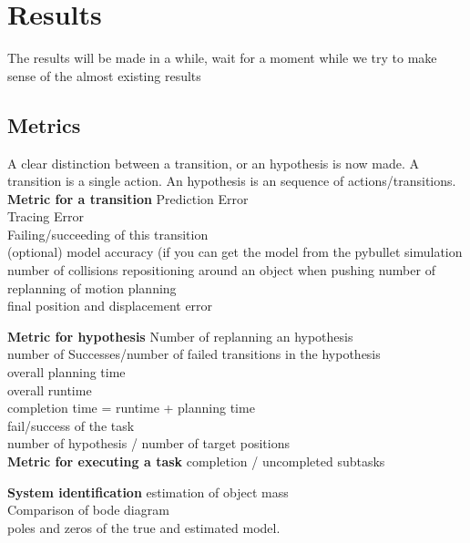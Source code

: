 \chapter{Results}


The results will be made in a while, wait for a moment while we try to make sense of the almost existing results



\section{Metrics}

A clear distinction between a transition, or an hypothesis is now made. A transition is a single action. An hypothesis is an sequence of actions/transitions.\\

\textbf{Metric for a transition}
\newline
Prediction Error\\
Tracing Error\\
Failing/succeeding of this  transition\\
(optional) model accuracy (if you can get the model from the pybullet simulation
number of collisions
repositioning around an object when pushing
number of replanning of motion planning\\
final position and displacement error\\


\textbf{Metric for hypothesis}
\newline
Number of replanning an hypothesis\\
number of Successes/number of failed transitions in the hypothesis\\
overall planning time\\
overall runtime\\
completion time = runtime + planning time\\
fail/success of the task\\
number of hypothesis / number of target positions\\

\textbf{Metric for executing a task}
completion / uncompleted subtasks


\textbf{System identification}
\newline
estimation of object mass\\
Comparison of bode diagram\\
poles and zeros of the true and estimated model.\\


